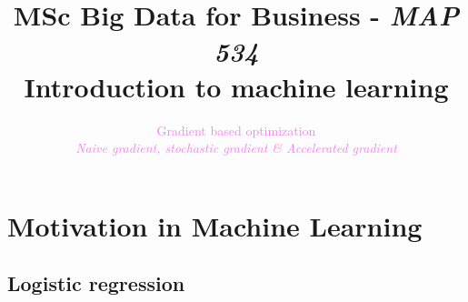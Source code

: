 \documentclass[9pt]{beamer}
\title[Introduction to machine learning]{MSc Big Data for Business - {\em MAP 534} \\
Introduction to machine learning\\}
\author{}
\date{}
\begin{document}
\author[S. Le Corff]{\textcolor{violet}{Gradient based optimization}\\ {\em {\small \textcolor{violet}{Naive gradient, stochastic gradient \& Accelerated gradient}}}}

\begin{frame}
  \titlepage
\end{frame}


 \section{Motivation in Machine Learning}

\subsection{Logistic regression}
\end{document}

